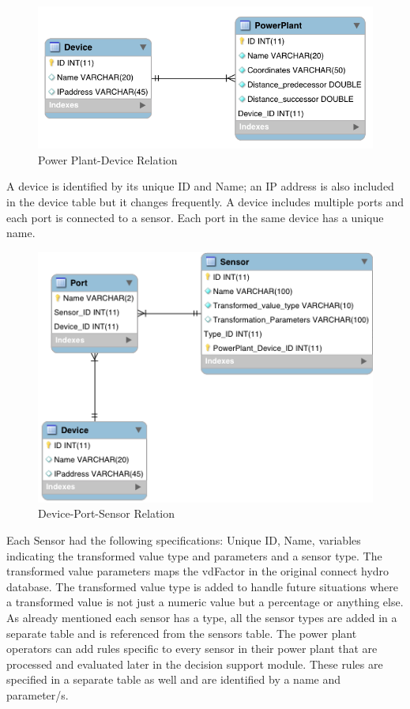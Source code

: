 \begin{figure}[H]
\centering
\includegraphics[scale=0.4]{Images/Device-Powerplant.png}
\caption[Power Plant-Device Relation]{Power Plant-Device Relation}
\end{figure}
A device is identified by its unique ID and Name; an IP address is also included in the device table but it changes frequently. A device includes multiple ports and each port is connected to a sensor. Each port in the same device has a unique name. 
\begin{figure}[H]
\centering
\includegraphics[scale=0.6]{Images/Device-Port-Sensor.png}
\caption[Device-Port-Sensor Relation]{Device-Port-Sensor Relation}
\end{figure}
Each Sensor had the following specifications: Unique ID, Name, variables indicating the transformed value type and parameters and a sensor type. The transformed value parameters maps the vdFactor in the original connect hydro database. The transformed value type is added to handle future situations where a transformed value is not just a numeric value but a percentage or anything else. As already mentioned each sensor has a type, all the sensor types are added in a separate table and is referenced from the sensors table. The power plant operators can add rules specific to every sensor in their power plant that are processed and evaluated later in the decision support module. These rules are specified in a separate table as well and are identified by a name and parameter/s.
